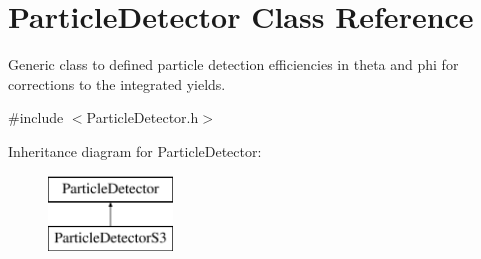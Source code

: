 \hypertarget{classParticleDetector}{\section{Particle\-Detector Class Reference}
\label{classParticleDetector}
}


Generic class to defined particle detection efficiencies in theta and phi for corrections to the integrated yields.  




{\ttfamily \#include $<$Particle\-Detector.\-h$>$}

Inheritance diagram for Particle\-Detector\-:\begin{figure}[H]
\begin{center}
\leavevmode
\includegraphics[height=2.000000cm]{classParticleDetector}
\end{center}
\end{figure}
